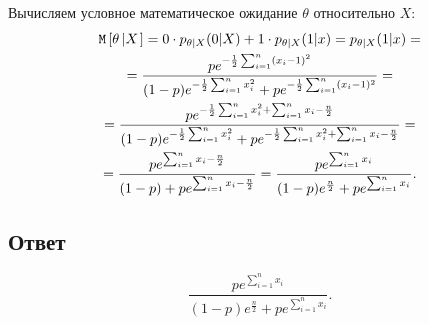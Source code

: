Вычисляем условное математическое ожидание $\theta$ относительно $X$:
\begin{multline}
    \mathtt{M} \left [  \theta \left | X \right . \right ] = 0 \cdot p_{\theta|X}(0|X) + 1 \cdot p_{\theta|X}(1|x) = p_{\theta|X}(1|x) = \\
    = \frac{p e^{-\frac{1}{2} \sum_{i=1}^n (x_i - 1)^2}}{(1-p) e^{-\frac{1}{2} \sum_{i=1}^n x_i^2} + p e^{-\frac{1}{2} \sum_{i=1}^n (x_i - 1)^2}} = \\
    = \frac{p e^{-\frac{1}{2} \sum_{i=1}^n x_i^2 + \sum_{i=1}^n x_i - \frac{n}{2}}}{(1-p) e^{-\frac{1}{2} \sum_{i=1}^n x_i^2} + p e^{-\frac{1}{2} \sum_{i=1}^n x_i^2 + \sum_{i=1}^n x_i - \frac{n}{2}}} = \\
    = \frac{p e^{\sum_{i=1}^n x_i - \frac{n}{2}}}{(1-p) + p e^{\sum_{i=1}^n x_i - \frac{n}{2}}}
    = \frac{p e^{\sum_{i=1}^n x_i}}{(1-p)e^{\frac{n}{2}} + p e^{\sum_{i=1}^n x_i}} .
\end{multline}

\subsection*{Ответ}

\begin{equation}
    \frac{p e^{\sum_{i=1}^n x_i}}{(1-p)e^{\frac{n}{2}} + p e^{\sum_{i=1}^n x_i}} .
    \end{equation}
